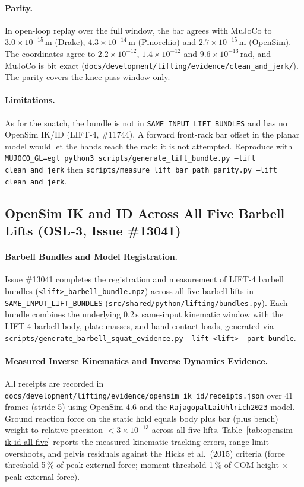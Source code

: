 \documentclass[11pt,a4paper]{article}
\begin{document}
\paragraph{Parity.} In open-loop replay over the full window, the bar agrees with
MuJoCo to $3.0\times10^{-15}$\,m (Drake), $4.3\times10^{-14}$\,m (Pinocchio)
and $2.7\times10^{-15}$\,m (OpenSim). The coordinates agree to
$2.2\times10^{-12}$, $1.4\times10^{-12}$ and $9.6\times10^{-13}$\,rad, and
MuJoCo is bit exact (\texttt{docs/development/lifting/evidence/clean\_and\_jerk/}).
The parity covers the knee-pass window only.

\paragraph{Limitations.} As for the snatch, the bundle is not in
\texttt{SAME\_INPUT\_LIFT\_BUNDLES} and has no OpenSim IK/ID (LIFT-4,
\#11744). A forward front-rack bar offset in the planar model would let the
hands reach the rack; it is not attempted. Reproduce with
\texttt{MUJOCO\_GL=egl python3 scripts/generate\_lift\_bundle.py --lift
clean\_and\_jerk} then
\texttt{scripts/measure\_lift\_bar\_path\_parity.py --lift clean\_and\_jerk}.

\subsection{OpenSim IK and ID Across All Five Barbell Lifts (OSL-3, Issue \#13041)}\label{sec:opensim-ik-id-all-five}
\paragraph{Barbell Bundles and Model Registration.}
Issue \#13041 completes the registration and measurement of LIFT-4 barbell bundles
(\texttt{<lift>\_barbell\_bundle.npz}) across all five barbell lifts in
\texttt{SAME\_INPUT\_LIFT\_BUNDLES} (\texttt{src/shared/python/lifting/bundles.py}).
Each bundle combines the underlying 0.2\,s same-input kinematic window with the
LIFT-4 barbell body, plate masses, and hand contact loads, generated via
\texttt{scripts/generate\_barbell\_squat\_evidence.py --lift <lift> --part bundle}.

\paragraph{Measured Inverse Kinematics and Inverse Dynamics Evidence.}
All receipts are recorded in \texttt{docs/development/lifting/evidence/opensim\_ik\_id/receipts.json}
over 41 frames (stride 5) using OpenSim 4.6 and the \texttt{RajagopalLaiUhlrich2023} model.
Ground reaction force on the static hold equals body plus bar (plus bench) weight to
relative precision $< 3\times 10^{-13}$ across all five lifts. Table~\ref{tab:opensim-ik-id-all-five}
reports the measured kinematic tracking errors, range limit overshoots, and pelvis residuals
against the Hicks et al.\ (2015) criteria (force threshold 5\,\% of peak external force;
moment threshold 1\,\% of COM height $\times$ peak external force).
\end{document}
